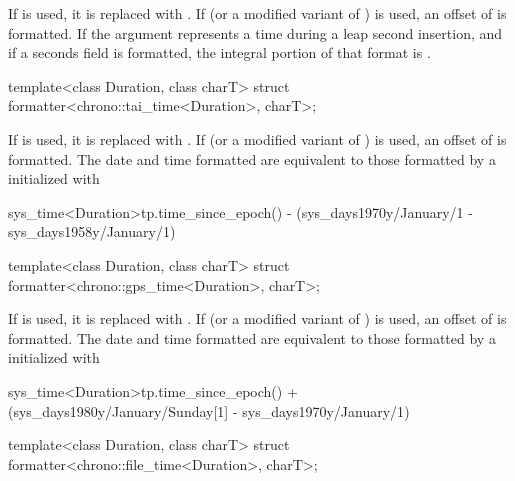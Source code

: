 \begin{itemdescr}
\pnum
\remarks
If  is used,
it is replaced with .
If  (or a modified variant of ) is used,
an offset of  is formatted.
If the argument represents a time during a leap second insertion,
and if a seconds field is formatted,
the integral portion of that format is
.
\end{itemdescr}

%
\begin{itemdecl}
template<class Duration, class charT>
  struct formatter<chrono::tai_time<Duration>, charT>;
\end{itemdecl}

\begin{itemdescr}
\pnum
\remarks
If  is used,
it is replaced with .
If  (or a modified variant of ) is used,
an offset of  is formatted.
The date and time formatted are equivalent to
those formatted by a  initialized with
\begin{codeblock}
sys_time<Duration>{tp.time_since_epoch()} -
  (sys_days{1970y/January/1} - sys_days{1958y/January/1})
\end{codeblock}
\end{itemdescr}

%
\begin{itemdecl}
template<class Duration, class charT>
  struct formatter<chrono::gps_time<Duration>, charT>;
\end{itemdecl}

\begin{itemdescr}
\pnum
\remarks
If  is used,
it is replaced with .
If  (or a modified variant of ) is used,
an offset of  is formatted.
The date and time formatted are equivalent to
those formatted by a  initialized with
\begin{codeblock}
sys_time<Duration>{tp.time_since_epoch()} +
  (sys_days{1980y/January/Sunday[1]} - sys_days{1970y/January/1})
\end{codeblock}
\end{itemdescr}

%
\begin{itemdecl}
template<class Duration, class charT>
  struct formatter<chrono::file_time<Duration>, charT>;
\end{itemdecl}


